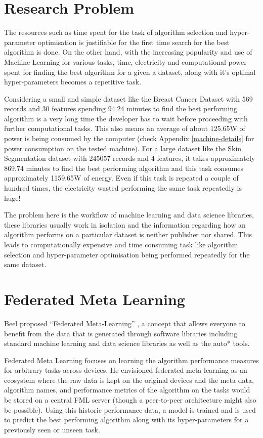 \section{Research Problem}
The resources such as time spent for the task of algorithm selection and hyper-parameter optimisation is justifiable for the first time search for the best algorithm is done. On the other hand, with the increasing popularity and use of Machine Learning for various tasks, time, electricity and computational power spent for finding the best algorithm for a given a dataset, along with it's optimal hyper-parameters becomes a repetitive task. 

Considering a small and simple dataset like the Breast Cancer Dataset with 569 records and 30 features spending 94.24 minutes to find the best performing algorithm is a very long time the developer has to wait before proceeding with further computational tasks. This also means an average of about 125.65W of power is being consumed by the computer (check Appendix \ref{machine-details} for power consumption on the tested machine). For a large dataset like the Skin Segmentation dataset with 245057 records and 4 features, it takes approximately 869.74 minutes to find the best performing algorithm and this task consumes approximately 1159.65W of energy. Even if this task is repeated a couple of hundred times, the electricity wasted performing the same task repeatedly is huge!

The problem here is the workflow of machine learning and data science libraries, these libraries usually work in isolation and the information regarding how an algorithm performs on a particular dataset is neither publisher nor shared. This leads to computationally expensive and time consuming task like algorithm selection and hyper-parameter optimisation being performed repeatedly for the same dataset.

\section{Federated Meta Learning}
Beel proposed “Federated Meta-Learning” \citep{fml}, a concept that allows everyone to benefit from the data that is generated through software libraries including standard machine learning and data science libraries as well as the auto* tools. 

Federated Meta Learning focuses on learning the algorithm performance measures for arbitrary tasks across devices. He envisioned federated meta learning as an ecosystem where the raw data is kept on the original  devices and the meta data, algorithm names, and performance metrics of the algorithm on the tasks would be stored on a central FML server (though a peer-to-peer architecture might also be possible). Using this historic performance data, a model is trained and is used to predict the best performing algorithm along with its hyper-parameters for a previously seen or unseen task.


